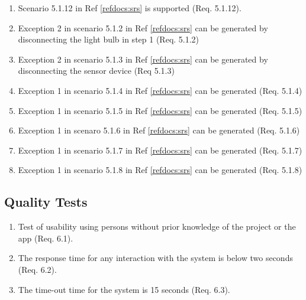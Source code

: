 \documentclass[a4paper]{article}
\newlength{\testlabellength}
\newenvironment{testlist}{\begin{enumerate}[label=\bfseries Test \thesubsection.\arabic* , labelindent=0pt, labelwidth=\testlabellength , leftmargin=2cm]}{\end{enumerate}}
\begin{document}
\begin{appendices}
\begin{testlist}
	\item Scenario 5.1.12 in Ref \ref{refdocs:srs} is supported (Req. 5.1.12).
	
	\item Exception 2 in scenario 5.1.2 in Ref \ref{refdocs:srs} can be generated by disconnecting the light bulb in step 1 (Req. 5.1.2)
	
	\item Exception 2 in scenario 5.1.3 in Ref \ref{refdocs:srs} can be generated by disconnecting the sensor device (Req 5.1.3)
	
	\item Exception 1 in scenario 5.1.4 in Ref \ref{refdocs:srs} can be generated (Req. 5.1.4)
	
	\item Exception 1 in scenario 5.1.5 in Ref \ref{refdocs:srs} can be generated (Req. 5.1.5)
	
	\item Exception 1 in scenaro 5.1.6 in Ref \ref{refdocs:srs} can be generated (Req. 5.1.6)
		
	\item Exception 1 in scenario 5.1.7 in Ref \ref{refdocs:srs} can be generated (Req. 5.1.7)
	
	\item Exception 1 in scenario 5.1.8 in Ref \ref{refdocs:srs} can be generated (Req. 5.1.8)
		
\end{testlist}

\subsection{Quality Tests}

\begin{testlist}
	\item Test of usability using persons without prior knowledge of the project or the app (Req. 6.1).
	
	\item The response time for any interaction with the system is below two seconds (Req. 6.2).
	
	\item The time-out time for the system is 15 seconds (Req. 6.3). 
	
\end{testlist}

\clearpage


\end{appendices}
\end{document}
